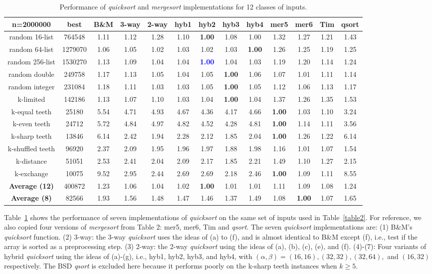 \documentclass[AMA,STIX1COL]{WileyNJD-v2}
\newcommand{\qusort}{\emph{quicksort }}
\newcommand{\qsort}{\emph{qsort }}
\newcommand{\qsortn}{\emph{qsort}}
\newcommand{\msort}{\emph{mergesort }}
\begin{document}
\begin{table}
\caption{Performance of \qusort and \msort implementations for 12 classes of inputs.}
\centering
\begin{tabular}{|c|c|c|c|c|c|c|c|c|c|c|c|c|}
\toprule
n=2000000 & best  & B\&M & 3-way & 2-way & hyb1 & hyb2 & hyb3 & hyb4 & mer5& mer6 & Tim & qsort \\
\midrule
random 16-list	&764548	&1.11&	1.12&	1.28&	1.10&	\textbf{1.00}&	1.08&	1.00&	1.32&	1.27&	1.21&	1.43\\
random 64-list&	1279070	&1.06	&1.05	&1.02	&1.03	&1.02	&1.03	&\textbf{1.00}	&1.26	&1.25	&1.19	&1.25\\
random 256-list&	1530270&	1.13&	1.09&	1.04&	1.04&	\textcolor{blue}{\textbf{1.00}}&	1.04&	1.03&	1.19&	1.20&	1.14&	1.24\\
random double&	249758	&1.17	&1.13	&1.05	&1.04	&1.05	&\textbf{1.00}	&1.06	&1.07	&1.01	&1.11	&1.14\\
random integer&	231084&	1.18&	1.11&	1.03&	1.03&	1.05&	\textbf{1.00}&	1.05&	1.12&	1.06&	1.13&	1.17\\
k-limited&	142186	&1.13	&1.07	&1.10	&1.03	&1.04	&\textbf{1.00}	&1.04	&1.37	&1.26	&1.35	&1.53\\
k-equal teeth&	25180&	5.54&	4.71&	4.93&	4.67&	4.36&	4.17&	4.66&	\textbf{1.00}&	1.03&	1.10&	3.24\\
k-even teeth&	24712	&5.72	&4.84	&4.97	&4.82	&4.52	&4.28	&4.81	&\textbf{1.00}	&1.14	&1.11&	3.56\\
k-sharp teeth&	13846	&6.14&	2.42&	1.94&	2.28&	2.12&	1.85&	2.04&	\textbf{1.00}&	1.26&	1.22&	6.14\\
k-shuffled teeth&	96920	&2.37	&2.09	&1.95	&1.96	&1.97	&1.88	&1.98	&1.16	&1.01	&1.07	&1.54\\
k-distance&	51051	&2.53&	2.41&	2.04&	2.09&	2.17&	1.85&	2.21&	1.49&	1.10&	1.27&	2.15\\
k-exchange&	10075	&9.52	&2.95	&2.44	&2.69	&2.69	&2.18	&2.46	&\textbf{1.00}	&1.09	&1.11	&8.55\\
\textbf{Average  (12)}&	400872&	1.23&	1.06&	1.04&	1.02&	\textbf{1.00}&	1.01&	1.01&	1.11&	1.09&	1.08&	1.24\\
\textbf{Average  (8)}&	82566	&1.93	&1.56	&1.48	&1.47	&1.46	&1.37	&1.49	&1.08	&\textbf{1.00}	&1.07	&1.65\\
\bottomrule
\end{tabular}
\label{table3}
\end{table}

Table~\ref{table3} shows the performance of seven implementations of \qusort on the same set of inputs used in Table~\ref{table2}. 
For reference, we also copied four versions of \msort from Table 2: mer5, mer6, Tim and \qsortn. 
The seven \qusort implementations are: (1) B\&M's \qusort function. (2) 3-way: the 3-way \qusort uses the ideas of (a) to (f), and is almost identical to B\&M except (f), i.e., test if the array is sorted as a preprocessing step. (3) 2-way: the 2-way \qusort using the ideas of (a), (b), (c), (e), and (f). (4)-(7): Four variants of hybrid \qusort using the ideas of (a)-(g), i.e., hyb1, hyb2, hyb3, and hyb4, with $(\alpha, \beta) = (16, 16), (32, 32), (32, 64),$ and $(16, 32)$ respectively. 
The BSD \qsort is excluded here because it performs poorly on the k-sharp teeth instances when $k \geq 5$.
\end{document}
